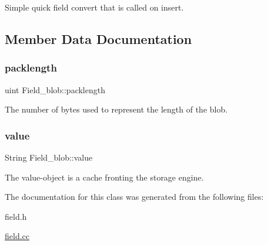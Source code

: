 Simple quick field convert that is called on insert. 

\subsection{Member Data Documentation}
\mbox{\label{classField__blob_a4752c1fb1007b71582e6698dcea35f19}} 
\subsubsection{\texorpdfstring{packlength}{packlength}}
{\footnotesize\ttfamily uint Field\+\_\+blob\+::packlength\hspace{0.3cm}{\ttfamily [protected]}}

The number of bytes used to represent the length of the blob. \mbox{\label{classField__blob_abc02fd1c1c4a61a46161d1a5e14f5a16}} 
\subsubsection{\texorpdfstring{value}{value}}
{\footnotesize\ttfamily String Field\+\_\+blob\+::value\hspace{0.3cm}{\ttfamily [protected]}}

The \textquotesingle{}value\textquotesingle{}-\/object is a cache fronting the storage engine. 

The documentation for this class was generated from the following files\+:\begin{DoxyCompactItemize}
\item 
field.\+h\item 
\mbox{\hyperlink{field_8cc}{field.\+cc}}\end{DoxyCompactItemize}
